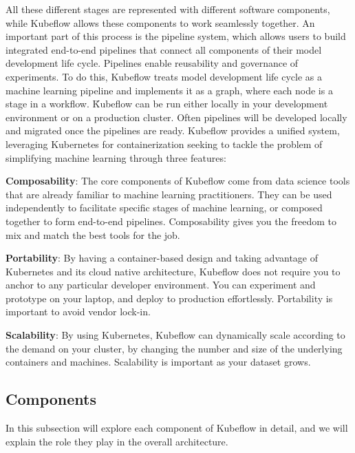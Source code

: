 All these different stages are represented with different software components, while Kubeflow allows these components
to work seamlessly together. An important part of this process is the pipeline system, which allows users to build
integrated end-to-end pipelines that connect all components of their model development life cycle. Pipelines enable
reusability and governance of experiments. To do this, Kubeflow treats model development life cycle as a machine
learning pipeline and implements it as a graph, where each node is a stage in a workflow. \v

Kubeflow can be run either locally in your development environment or on a production cluster. Often pipelines will
be developed locally and migrated once the pipelines are ready. Kubeflow provides a unified system, leveraging
Kubernetes for containerization seeking to tackle the problem of simplifying machine learning through three features:
\bit
\item \textbf{Composability}: The core components of Kubeflow come from data science tools that are already familiar
to machine learning practitioners. They can be used independently to facilitate specific stages of machine learning,
or composed together to form end-to-end pipelines. Composability gives you the freedom to mix and match the best tools
for the job.
\item \textbf{Portability}: By having a container-based design and taking advantage of Kubernetes and its cloud
native architecture, Kubeflow does not require you to anchor to any particular developer environment. You can
experiment and prototype on your laptop, and deploy to production effortlessly. Portability is important to avoid
vendor lock-in.
\item \textbf{Scalability}: By using Kubernetes, Kubeflow can dynamically scale according to the demand on your
cluster, by changing the number and size of the underlying containers and machines. Scalability is important as your
dataset grows.
\eit

\subsection{Components}

In this subsection will explore each component of Kubeflow in detail, and we will explain the role they play in the
overall architecture.

